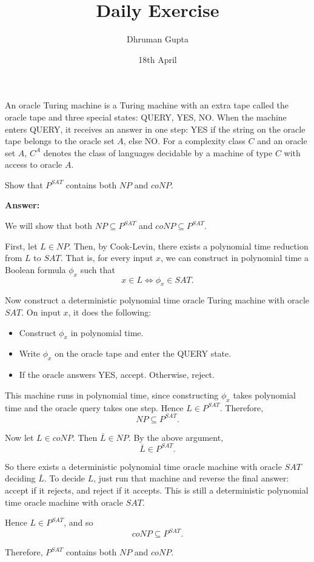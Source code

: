 \documentclass[11pt]{article}
\title{Daily Exercise}
\author{Dhruman Gupta}
\date{18th April}
\begin{document}

An oracle Turing machine is a Turing machine with an extra tape called the oracle tape and three special states: QUERY, YES, NO. When the machine enters QUERY, it receives an answer in one step: YES if the string on the oracle tape belongs to the oracle set $A$, else NO. For a complexity class $C$ and an oracle set $A$, $C^A$ denotes the class of languages decidable by a machine of type $C$ with access to oracle $A$.

Show that $P^{SAT}$ contains both $NP$ and $coNP$.

\textbf{Answer:}

We will show that both $NP \subseteq P^{SAT}$ and $coNP \subseteq P^{SAT}$.

First, let $L \in NP$. Then, by Cook-Levin, there exists a polynomial time reduction from $L$ to $SAT$. That is, for every input $x$, we can construct in polynomial time a Boolean formula $\phi_x$ such that
\[
x \in L \iff \phi_x \in SAT.
\]

Now construct a deterministic polynomial time oracle Turing machine with oracle $SAT$. On input $x$, it does the following:
\begin{itemize}
    \item Construct $\phi_x$ in polynomial time.
    \item Write $\phi_x$ on the oracle tape and enter the QUERY state.
    \item If the oracle answers YES, accept. Otherwise, reject.
\end{itemize}

This machine runs in polynomial time, since constructing $\phi_x$ takes polynomial time and the oracle query takes one step. Hence $L \in P^{SAT}$. Therefore,
\[
NP \subseteq P^{SAT}.
\]

Now let $L \in coNP$. Then $\overline{L} \in NP$. By the above argument,
\[
\overline{L} \in P^{SAT}.
\]

So there exists a deterministic polynomial time oracle machine with oracle $SAT$ deciding $\overline{L}$. To decide $L$, just run that machine and reverse the final answer: accept if it rejects, and reject if it accepts. This is still a deterministic polynomial time oracle machine with oracle $SAT$.

Hence $L \in P^{SAT}$, and so
\[
coNP \subseteq P^{SAT}.
\]

Therefore, $P^{SAT}$ contains both $NP$ and $coNP$.
\end{document}
